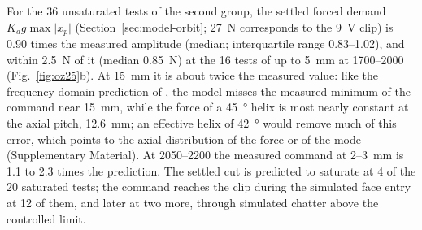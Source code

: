 For the 36 unsaturated tests of the second group, the settled forced demand $K_ag\max\lvert\dot x_p\rvert$ (Section~\ref{sec:model-orbit}; \SI{27}{\newton} corresponds to the \SI{9}{\volt} clip) is 0.90 times the measured amplitude (median; interquartile range 0.83--1.02), and within \SI{2.5}{\newton} of it (median \SI{0.85}{\newton}) at the 16 tests of up to \SI{5}{\milli\metre} at 1700--\SI{2000}{\rpm} (Fig.~\ref{fig:oz25}b). At \SI{15}{\milli\metre} it is about twice the measured value: like the frequency-domain prediction of \citet{ozsoy2025frequency}, the model misses the measured minimum of the command near \SI{15}{\milli\metre}, while the force of a \SI{45}{\degree} helix is most nearly constant at the axial pitch, \SI{12.6}{\milli\metre}; an effective helix of \SI{42}{\degree} would remove much of this error, which points to the axial distribution of the force or of the mode (Supplementary Material). At 2050--\SI{2200}{\rpm} the measured command at 2--\SI{3}{\milli\metre} is 1.1 to 2.3 times the prediction. The settled cut is predicted to saturate at 4 of the 20 saturated tests; the command reaches the clip during the simulated face entry at 12 of them, and later at two more, through simulated chatter above the controlled limit.

